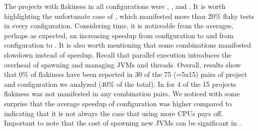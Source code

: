The projects with flakiness
in all configurations were , , and
.  It is worth highlighting the unfortunate case of
, which manifested more than 20\% flaky tests in
every configuration.  Considering time, it is noticeable from the
averages, perhaps as expected, an increasing speedup from
configuration \emph{\SeqClassParMeth} to \emph{\ParClassParMeth} and
from configuration \emph{\ForkSeq} to \emph{\ForkParMeth}.  It is also
worth mentioning that some combinations manifested slowdown instead of
speedup.  Recall that parallel execution introduces the overhead of
spawning and managing JVMs and threads.  Overall, results show that
0\% of flakiness have been reported in 30 of the 75 (=5x15)
pairs of project and configuration we analyzed (40\% of the total).
In for 4 of the 15 projects flakiness was not manifested in 
any combination pairs.  We noticed with some surprise that the average speedup of
configuration \emph{\SeqClassParMeth} was higher compared to
\emph{\ForkParMeth} indicating that it is not always the case that
using more CPUs pays off. Important to note that the cost of spawning
new JVMs can be significant in \emph{\ForkParMeth}.



\begin{center}
\end{center}

